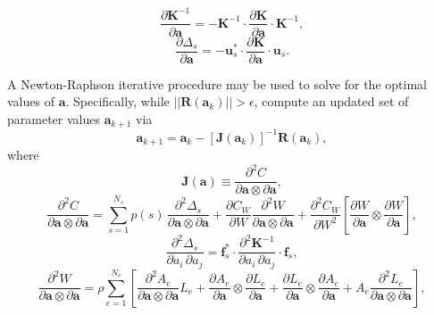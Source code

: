 \documentclass[12pt,a4paper,article]{memoir} %
\begin{document}
\begin{equation}
        \frac{\partial \mathbf{K}^{-1}}{\partial \mathbf{a}} = - \mathbf{K}^{-1} \cdot \frac{\partial \mathbf{K}}{\partial \mathbf{a}} \cdot \mathbf{K}^{-1},
\end{equation}
\begin{equation}
        \frac{\partial \Delta_s}{\partial \mathbf{a}} = - \mathbf{u}^*_s \cdot \frac{\partial \mathbf{K}}{\partial \mathbf{a}} \cdot \mathbf{u}_s.
\end{equation}

A Newton-Raphson iterative procedure may be used to solve for the optimal values of $\mathbf{a}$. Specifically, while $||\mathbf{R} (\mathbf{a}_k)|| > \epsilon$, compute an updated set of parameter values $\mathbf{a}_{k+1}$ via
\begin{equation}
        \mathbf{a}_{k+1} = \mathbf{a}_k - \left[ \mathbf{J} (\mathbf{a}_k) \right]^{-1} \mathbf{R} (\mathbf{a}_k),
\end{equation}
where
\begin{equation}
        \mathbf{J} (\mathbf{a}) \equiv \frac{\partial^2 C}{\partial \mathbf{a} \otimes \partial \mathbf{a}},
\end{equation}
\begin{equation}
        \frac{\partial^2 C}{\partial \mathbf{a} \otimes \partial \mathbf{a}} = \sum_{s=1}^{N_s} p(s) \, \frac{\partial^2 \Delta_s}{\partial \mathbf{a} \otimes \partial \mathbf{a}} + \frac{\partial C_W}{\partial W} \frac{\partial^2 W}{\partial \mathbf{a} \otimes \partial \mathbf{a}} + \frac{\partial^2 C_W}{\partial W^2} \left[ \frac{\partial W}{\partial \mathbf{a}} \otimes \frac{\partial W}{\partial \mathbf{a}} \right],
\end{equation}
\begin{equation}
        \frac{\partial^2 \Delta_s}{\partial a_i \, \partial a_j} = \mathbf{f}^*_s \cdot \frac{\partial^2 \mathbf{K}^{-1}}{\partial a_i \, \partial a_j} \cdot \mathbf{f}_s,
\end{equation}
\begin{equation}
        \frac{\partial^2 W}{\partial \mathbf{a} \otimes \partial \mathbf{a}} = \rho \sum_{e=1}^{N_e} \left[ \frac{\partial^2 A_e}{\partial \mathbf{a} \otimes \partial \mathbf{a}} L_e + \frac{\partial A_e}{\partial \mathbf{a}} \otimes \frac{\partial L_e}{\partial \mathbf{a}} + \frac{\partial L_e}{\partial \mathbf{a}} \otimes \frac{\partial A_e}{\partial \mathbf{a}} + A_e \frac{\partial^2 L_e}{\partial \mathbf{a} \otimes \partial \mathbf{a}} \right],
\end{equation}
\end{document}
